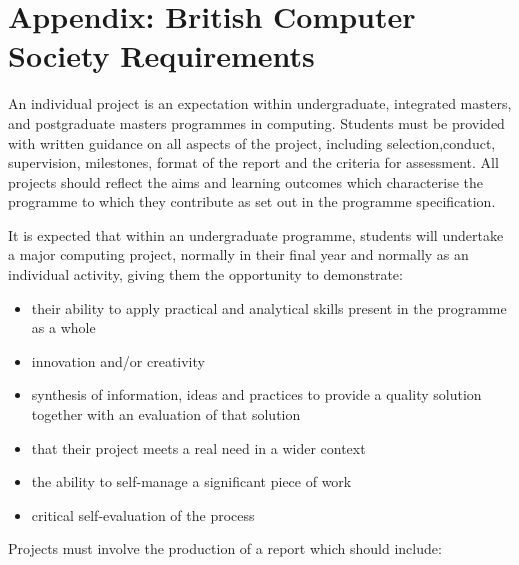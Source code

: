 \documentclass{../fal_assignment}
\begin{document}
\section*{Appendix: British Computer Society Requirements}

An individual project is an expectation within undergraduate, integrated masters, and postgraduate masters programmes in computing. Students must be provided with written guidance on all aspects of the project, including selection,conduct, supervision, milestones, format of the report and the criteria for assessment. All projects should reflect the aims and learning outcomes which characterise the programme to which they contribute as set out in the programme specification.

It is expected that within an undergraduate programme, students will undertake a major computing project, normally in
their final year and normally as an individual activity, giving them the opportunity to demonstrate:

\begin{itemize}
\item their ability to apply practical and analytical skills present in the programme as a whole
\item innovation and/or creativity
\item synthesis of information, ideas and practices to provide a quality solution together with an evaluation of that solution
\item that their project meets a real need in a wider context
\item the ability to self-manage a significant piece of work
\item critical self-evaluation of the process
\end{itemize}

Projects must involve the production of a report which should include:
\end{document}
